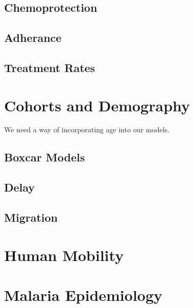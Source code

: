 \documentclass[
]{book}
\begin{document}
\hypertarget{chemoprotection}{%
\section{Chemoprotection}\label{chemoprotection}}

\hypertarget{adherance}{%
\section{Adherance}\label{adherance}}

\hypertarget{treatment-rates}{%
\section{Treatment Rates}\label{treatment-rates}}

\hypertarget{cohorts-and-demography}{%
\chapter{Cohorts and Demography}\label{cohorts-and-demography}}

We need a way of incorporating age into our models.

\hypertarget{boxcar-models}{%
\section{Boxcar Models}\label{boxcar-models}}

\hypertarget{delay}{%
\section{Delay}\label{delay}}

\hypertarget{migration}{%
\section{Migration}\label{migration}}

\hypertarget{human-mobility}{%
\chapter{Human Mobility}\label{human-mobility}}

\hypertarget{malaria-epidemiology}{%
\chapter{Malaria Epidemiology}\label{malaria-epidemiology}}
\end{document}
